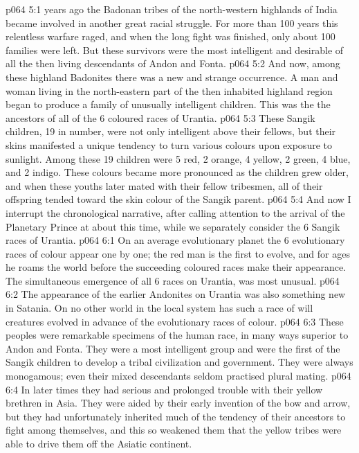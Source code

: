 \vs p064 5:1  years ago the Badonan tribes of the north\hyp{}western highlands of India became involved in another great racial struggle. For more than 100 years this relentless warfare raged, and when the long fight was finished, only about 100 families were left. But these survivors were the most intelligent and desirable of all the then living descendants of Andon and Fonta.
\vs p064 5:2 And now, among these highland Badonites there was a new and strange occurrence. A man and woman living in the north\hyp{}eastern part of the then inhabited highland region began  to produce a family of unusually intelligent children. This was the  the ancestors of all of the 6 coloured races of Urantia.
\vs p064 5:3 These Sangik children, 19 in number, were not only intelligent above their fellows, but their skins manifested a unique tendency to turn various colours upon exposure to sunlight. Among these 19 children were 5 red, 2 orange, 4 yellow, 2 green, 4 blue, and 2 indigo. These colours became more pronounced as the children grew older, and when these youths later mated with their fellow tribesmen, all of their offspring tended toward the skin colour of the Sangik parent.
\vs p064 5:4 And now I interrupt the chronological narrative, after calling attention to the arrival of the Planetary Prince at about this time, while we separately consider the 6 Sangik races of Urantia.
\vs p064 6:1 On an average evolutionary planet the 6 evolutionary races of colour appear one by one; the red man is the first to evolve, and for ages he roams the world before the succeeding coloured races make their appearance. The simultaneous emergence of all 6 races on Urantia,  was most unusual.
\vs p064 6:2 The appearance of the earlier Andonites on Urantia was also something new in Satania. On no other world in the local system has such a race of will creatures evolved in advance of the evolutionary races of colour.
\vs p064 6:3 \bibnobreakspace {} These peoples were remarkable specimens of the human race, in many ways superior to Andon and Fonta. They were a most intelligent group and were the first of the Sangik children to develop a tribal civilization and government. They were always monogamous; even their mixed descendants seldom practised plural mating.
\vs p064 6:4 In later times they had serious and prolonged trouble with their yellow brethren in Asia. They were aided by their early invention of the bow and arrow, but they had unfortunately inherited much of the tendency of their ancestors to fight among themselves, and this so weakened them that the yellow tribes were able to drive them off the Asiatic continent.
